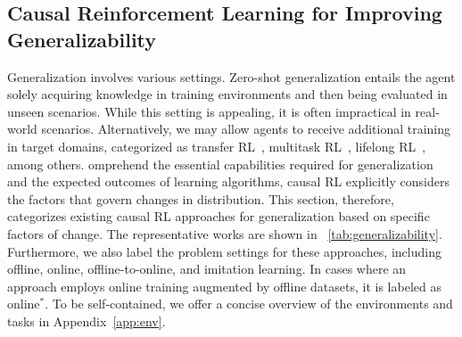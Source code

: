 \documentclass[10pt]{article} %
\theoremstyle{definition}
\begin{document}
\subsection{Causal Reinforcement Learning for Improving Generalizability}
\label{subsec:3.3generalizability}
 
Generalization involves various settings. Zero-shot generalization entails the agent solely acquiring knowledge in training environments and then being evaluated in unseen scenarios. 
While this setting is appealing, it is often impractical in real-world scenarios. 
Alternatively, we may allow agents to receive additional training in target domains, categorized as transfer RL~\citep{zhuTransferLearningDeep2020}, multitask RL~\citep{vithayathilvargheseSurveyMultitaskDeep2020}, lifelong RL~\citep{khetarpalContinualReinforcementLearning2022}, among others. 
omprehend the essential capabilities required for generalization and the expected outcomes of learning algorithms, causal RL explicitly considers the factors that govern changes in distribution. 
This section, therefore, categorizes existing causal RL approaches for generalization based on specific factors of change. 
The representative works are shown in \tablename~\ref{tab:generalizability}. 
Furthermore, we also label the problem settings for these approaches, including offline, online, offline-to-online, and imitation learning. 
In cases where an approach employs online training augmented by offline datasets, it is labeled as online$^*$. 
To be self-contained, we offer a concise overview of the environments and tasks in Appendix~\ref{app:env}.
\end{document}

